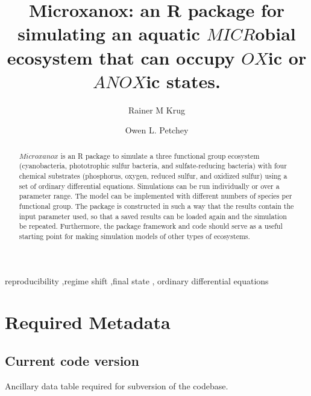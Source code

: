 \documentclass[]{elsarticle} %
\begin{document}
\begin{frontmatter}

  \title{Microxanox: an R package for simulating an aquatic \(MICR\)obial ecosystem that can occupy \(OX\)ic or \(ANOX\)ic states.}
    \author[University of Zürich]{Rainer M Krug%
  }
    \author[University of Zürich]{Owen L. Petchey%
  }
  
  \begin{abstract}
  \(Microxanox\) is an R package to simulate a three functional group ecosystem (cyanobacteria, phototrophic sulfur bacteria, and sulfate-reducing bacteria) with four chemical substrates (phosphorus, oxygen, reduced sulfur, and oxidized sulfur) using a set of ordinary differential equations. Simulations can be run individually or over a parameter range. The model can be implemented with different numbers of species per functional group. The package is constructed in such a way that the results contain the input parameter used, so that a saved results can be loaded again and the simulation be repeated. Furthermore, the package framework and code should serve as a useful starting point for making simulation models of other types of ecosystems.
  \end{abstract}
    \begin{keyword}
    reproducibility \sep regime shift \sep final state \sep 
    ordinary differential equations
  \end{keyword}
  
 \end{frontmatter}

\pagebreak

\section{Required Metadata}\label{required-metadata}

\subsection{Current code version}\label{current-code-version}

Ancillary data table required for subversion of the codebase.
\end{document}
